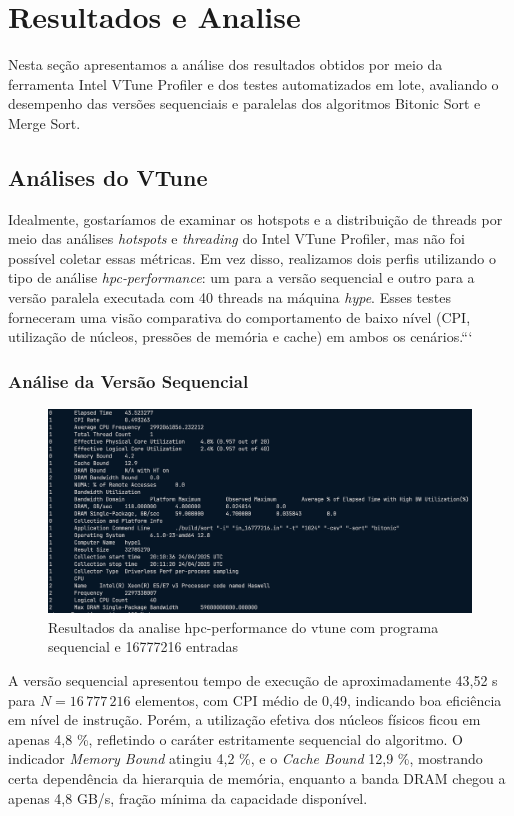 \documentclass{article}
\begin{document}
\section{Resultados e Analise}

Nesta seção apresentamos a análise dos resultados obtidos por meio da ferramenta Intel VTune Profiler e dos testes automatizados em lote, avaliando o desempenho das versões sequenciais e paralelas dos algoritmos Bitonic Sort e Merge Sort.

\subsection{Análises do VTune}

Idealmente, gostaríamos de examinar os hotspots e a distribuição de threads por meio das análises \emph{hotspots} e \emph{threading} do Intel VTune Profiler, mas não foi possível coletar essas métricas. Em vez disso, realizamos dois perfis utilizando o tipo de análise \emph{hpc‐performance}: um para a versão sequencial e outro para a versão paralela executada com 40 threads na máquina \textit{hype}. Esses testes forneceram uma visão comparativa do comportamento de baixo nível (CPI, utilização de núcleos, pressões de memória e cache) em ambos os cenários.```

\subsubsection{Análise da Versão Sequencial}

\begin{figure}[H]
    \centering
    \includegraphics[width=0.8\linewidth]{images/vtune_sequential.png}
    \caption{Resultados da analise hpc-performance do vtune com programa sequencial e 16777216 entradas}
    \label{fig:vtune_sequential}
\end{figure}

A versão sequencial apresentou tempo de execução de aproximadamente 43,52 s para $N = 16\,777\,216$ elementos, com CPI médio de 0,49, indicando boa eficiência em nível de instrução. Porém, a utilização efetiva dos núcleos físicos ficou em apenas 4,8 \%, refletindo o caráter estritamente sequencial do algoritmo. O indicador \emph{Memory Bound} atingiu 4,2 \%, e o \emph{Cache Bound} 12,9 \%, mostrando certa dependência da hierarquia de memória, enquanto a banda DRAM chegou a apenas 4,8 GB/s, fração mínima da capacidade disponível.
\end{document}
